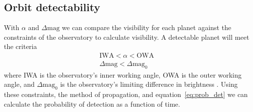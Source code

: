 \subsection{Orbit detectability}
With $\alpha$ and $\Delta\mathrm{mag}$ we can compare the visibility for each
planet against the constraints of the observatory to calculate visibility. A detectable planet will
meet the criteria
\begin{align}
    \text{IWA} < \alpha < \text{OWA}\label{eq:alpha_constraint}\\
    \Delta\mathrm{mag} < \Delta\mathrm{mag}_0\label{eq:dMag_constraint}
\end{align}
where IWA is the observatory's inner working angle, OWA is the outer working angle, and
$\Delta\mathrm{mag}_0$ is the observatory's limiting difference in brightness \citep[effectively equivalent to the instrument contrast capability---for further discussion see][]{Brown2005d}. Using these
constraints, the method of propagation, and equation~\ref{eq:prob_det} we can calculate the
probability of detection as a function of time.
